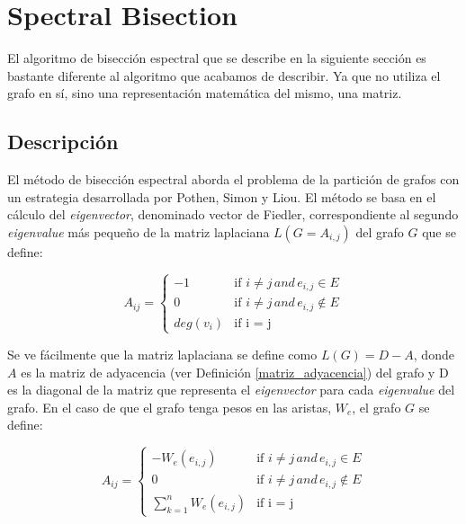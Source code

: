 \section{Spectral Bisection}\label{Spectral-Bisection}

El algoritmo de bisección espectral que se describe en la siguiente sección es bastante diferente al algoritmo que acabamos de describir. Ya que no utiliza el grafo en sí, sino una representación matemática del mismo, una matriz.

\subsection{Descripción}

El método de bisección espectral aborda el problema de la partición de grafos con un estrategia desarrollada por Pothen, Simon y Liou\cite{PothenSimon}. El método se basa en el cálculo del \textit{eigenvector}, denominado vector de Fiedler\cite{Fiedler}, correspondiente al segundo \textit{eigenvalue} más pequeño de la matriz laplaciana $L(G = A_{i,j})$ del grafo $G$ que se define:

\begin{center}
	$$
	A_{ij} = 
	\begin{cases}
	-1 & \text{if $i \neq j \, and \, e_{i, j} \in E$} \\
	0 & \text{if $i \neq j \, and \, e_{i, j} \notin E$} \\
	 deg(v_{i}) & \text{if i = j} 
	\end{cases}
	$$
\end{center}

Se ve fácilmente que la matriz laplaciana se define como $L(G) = D - A$, donde $A$ es la matriz de adyacencia (ver Definición \ref{matriz_adyacencia}) del grafo y D es la diagonal de la matriz que representa el \textit{eigenvector} para cada \textit{eigenvalue} del grafo. En el caso de que el grafo tenga pesos en las aristas, $W_{e}$, el grafo $G$ se define:

\begin{center}
	$$
	A_{ij} = 
	\begin{cases}
	-W_{e}(e_{i, j}) & \text{if $i \neq j \, and \, e_{i, j} \in E$} \\
	0 & \text{if $i \neq j \, and \, e_{i, j} \notin E$} \\
	\sum_{k=1}^{n} W_{e}(e_{i, j}) & \text{if i = j} 
	\end{cases}
	$$
\end{center}


